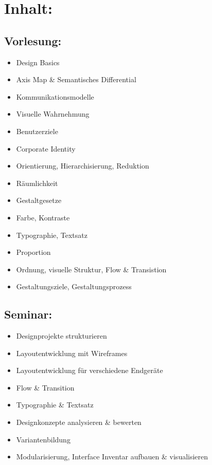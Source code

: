 \section{Inhalt:}\label{inhalt-25}

\subsection{Vorlesung:}\label{vorlesung}

\begin{itemize}
\tightlist
\item
  Design Basics
\item
  Axis Map \& Semantisches Differential
\item
  Kommunikationsmodelle
\item
  Visuelle Wahrnehmung
\item
  Benutzerziele
\item
  Corporate Identity
\item
  Orientierung, Hierarchisierung, Reduktion
\item
  Räumlichkeit
\item
  Gestaltgesetze
\item
  Farbe, Kontraste
\item
  Typographie, Textsatz
\item
  Proportion
\item
  Ordnung, visuelle Struktur, Flow \& Transistion
\item
  Gestaltungsziele, Gestaltungsprozess
\end{itemize}

\subsection{Seminar:}\label{seminar}

\begin{itemize}
\tightlist
\item
  Designprojekte strukturieren
\item
  Layoutentwicklung mit Wireframes
\item
  Layoutentwicklung für verschiedene Endgeräte
\item
  Flow \& Transition
\item
  Typographie \& Textsatz
\item
  Designkonzepte analysieren \& bewerten
\item
  Variantenbildung
\item
  Modularisierung, Interface Inventar aufbauen \& visualisieren
\end{itemize}

